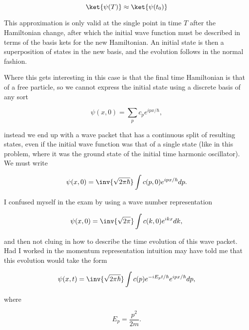 \begin{equation}\label{eqn:qmTwoExamReflection:50}
\ket{\psi(T)} \approx \ket{\psi(t_0)}
\end{equation}

This approximation is only valid at the single point in time $T$ after the Hamiltonian change, after which the initial wave function must be described in terms of the basis kets for the new Hamiltonian.  An initial state is then a superposition of states in the new basis, and the evolution follows in the normal fashion.

Where this gets interesting in this case is that the final time Hamiltonian is that of a free particle, so we cannot express the initial state using a discrete basis of any sort

\begin{equation}\label{eqn:qmTwoExamReflection:70}
\psi(x, 0) = \sum_p c_p e^{i p x/\hbar},
\end{equation}

instead we end up with a wave packet that has a continuous split of resulting states, even if the initial wave function was that of a single state (like in this problem, where it was the ground state of the initial time harmonic oscillator).  We must write

\begin{equation}\label{eqn:qmTwoExamReflection:90}
\psi(x, 0) = \inv{\sqrt{2 \pi \hbar}} \int c(p, 0) e^{i p x/\hbar} dp.
\end{equation}

I confused myself in the exam by using a wave number representation

\begin{equation}\label{eqn:qmTwoExamReflection:110}
\psi(x, 0) = \inv{\sqrt{2 \pi}} \int c(k, 0) e^{i k x} dk,
\end{equation}

and then not cluing in how to describe the time evolution of this wave packet.  Had I worked in the momentum representation intuition may have told me that this evolution would take the form

\begin{equation}\label{eqn:qmTwoExamReflection:130}
\psi(x, t) = \inv{\sqrt{2 \pi \hbar}} \int c(p) e^{- i E_p t/\hbar} e^{i p x/\hbar} dp,
\end{equation}

where

\begin{equation}\label{eqn:qmTwoExamReflection:150}
E_p = \frac{p^2}{2m}.
\end{equation}


